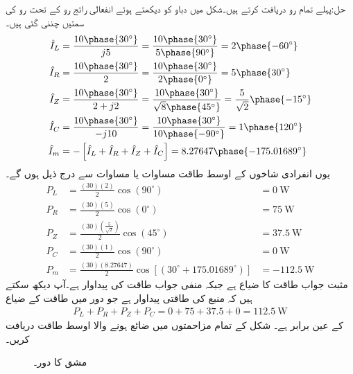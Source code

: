 حل:پہلے تمام رو دریافت کرتے ہیں۔شکل میں دباو کو دیکھتے ہوئے انفعالی رائج رو کے تحت رو کی سمتیں چننی گئی ہیں۔ 
\begin{align*}
\hat{I}_L&=\frac{10\phase{30^{\circ}}}{j5}=\frac{10\phase{30^{\circ}}}{5\phase{90^{\circ}}}=2\phase{-60^{\circ}}\\
\hat{I}_R&=\frac{10\phase{30^{\circ}}}{2}=\frac{10\phase{30^{\circ}}}{2\phase{0^{\circ}}}=5\phase{30^{\circ}}\\
\hat{I}_Z&=\frac{10\phase{30^{\circ}}}{2+j2}=\frac{10\phase{30^{\circ}}}{\sqrt{8}\phase{45^{\circ}}}=\frac{5}{\sqrt{2}}\phase{-15^{\circ}}\\
\hat{I}_C&=\frac{10\phase{30^{\circ}}}{-j10}=\frac{10\phase{30^{\circ}}}{10\phase{-90^{\circ}}}=1\phase{120^{\circ}}\\
\hat{I}_m&=-\left[\hat{I}_L+\hat{I}_R+\hat{I}_Z+\hat{I}_C\right]=8.27647\phase{-175.01689^{\circ}}
\end{align*}
یوں انفرادی شاخوں کے اوسط طاقت مساوات  یا مساوات  سے درج ذیل ہوں گے۔
\begin{align*}
P_L&=\frac{(30)(2)}{2}\cos(90^{\circ})&=\SI{0}{\watt}\\
P_R&=\frac{(30)(5)}{2}\cos(0^{\circ})&=\SI{75}{\watt}\\
P_Z&=\frac{(30)(\tfrac{5}{\sqrt{2}})}{2}\cos(45^{\circ})&=\SI{37.5}{\watt}\\
P_C&=\frac{(30)(1)}{2}\cos(90^{\circ})&=\SI{0}{\watt}\\
P_m&=\frac{(30)(8.27647)}{2}\cos[(30^{\circ}+175.01689^{\circ})]&=-\SI{112.5}{\watt}
\end{align*}
مثبت جواب طاقت کا ضیاع ہے جبکہ منفی جواب طاقت کی پیداوار ہے۔آپ دیکھ سکتے ہیں کہ منبع کی طاقتی پیداوار  ہے جو دور میں طاقت کے ضیاع 
\begin{align*}
P_L+P_R+P_Z+P_C=0+75+37.5+0=\SI{112.5}{\watt}
\end{align*}
کے عین برابر ہے۔
شکل  کے تمام مزاحمتوں میں ضائع ہونے والا اوسط طاقت دریافت کریں۔


\begin{figure}
\centering
{}
\caption{مشق  کا دور۔}
\label{شکل_طاقت_دریافت_کریں_الف}
\end{figure}


